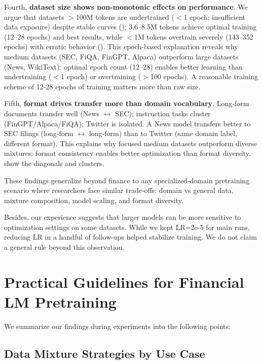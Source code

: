 Fourth, \textbf{dataset size shows non-monotonic effects on performance}. We argue that datasets $>$100M tokens are undertrained ($<$1 epoch; insufficient data exposure) despite stable curves (); 3.6–8.5M tokens achieve optimal training (12–28 epochs) and best results, while $<$1M tokens overtrain severely (143–352 epochs) with erratic behavior (). This epoch-based explanation reveals why medium datasets (SEC, FiQA, FinGPT, Alpaca) outperform large datasets (News, WikiText): optimal epoch count (12–28) enables better learning than undertraining ($<$1 epoch) or overtraining ($>$100 epochs). A reasonable training scheme of 12-28 epochs of training matters more than raw size.

Fifth, \textbf{format drives transfer more than domain vocabulary}. Long‑form documents transfer well (News $\leftrightarrow$ SEC); instruction tasks cluster (FinGPT/Alpaca/FiQA); Twitter is isolated. A News model transfers better to SEC filings (long‑form $\leftrightarrow$ long‑form) than to Twitter (same domain label, different format). This explains why focused medium datasets outperform diverse mixtures: format consistency enables better optimization than format diversity.  show the diagonals and clusters.

These findings generalize beyond finance to any specialized‑domain pretraining scenario where researchers face similar trade‑offs: domain vs general data, mixture composition, model scaling, and format diversity.

Besides, our experience suggests that larger models can be more sensitive to optimization settings on some datasets. While we kept LR=2e-5 for main runs, reducing LR in a handful of follow-ups helped stabilize training. We do not claim a general rule beyond this observation.

\section{Practical Guidelines for Financial LM Pretraining}

We summarize our findings during experiments into the following points:

\subsection{Data Mixture Strategies by Use Case}

